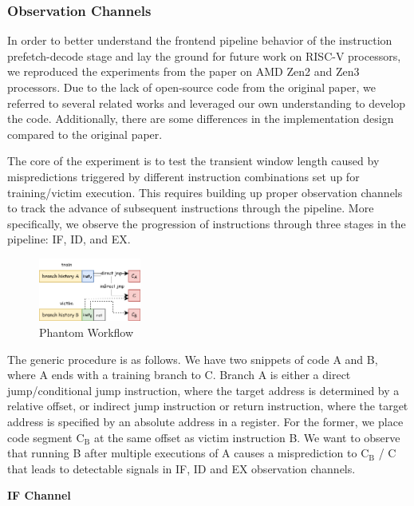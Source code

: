\subsubsection{Observation Channels}
\label{sec:x86 phantom}

In order to better understand the frontend pipeline behavior of the instruction prefetch-decode stage and lay the ground for future work on RISC-V processors, we reproduced the experiments from the paper\cite{phantom} on AMD Zen2 and Zen3 processors. Due to the lack of open-source code from the original paper, we referred to several related works and leveraged our own understanding to develop the code. Additionally, there are some differences in the implementation design compared to the original paper.

The core of the experiment is to test the transient window length caused by mispredictions triggered by different instruction combinations set up for training/victim execution. This requires building up proper observation channels to track the advance of subsequent instructions through the pipeline. More specifically, we observe the progression of instructions through three stages in the pipeline: IF, ID, and EX.

\begin{figure}
    \centering
    \includegraphics[width=0.3\textwidth]{Figure/trainning overview.png}
    \caption{Phantom Workflow}
    \label{fig:phantom workflow}
\end{figure}

The generic procedure is as follows. We have two snippets of code A and B, where A ends with a training branch to C. Branch A is either a direct jump/conditional jump instruction, where the target address is determined by a relative offset, or indirect jump instruction or return instruction, where the target address is specified by an absolute address in a register. For the former, we place code segment $\text{C}_\text{B}$ at the same offset as victim instruction B. We want to observe that running B after multiple executions of A causes a misprediction to $\text{C}_\text{B}$ / C that leads to detectable signals in IF, ID and EX observation channels.

\textbf{IF Channel}

